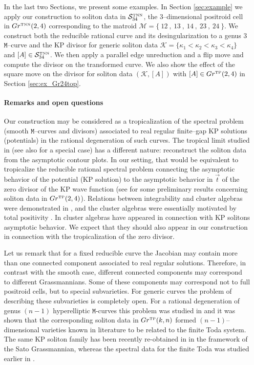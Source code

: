 \documentclass[11pt]{amsart}
\theoremstyle{plain}
\numberwithin{equation}{section}
\begin{document}
In the last two Sections, we present some examples. In Section \ref{sec:example} we apply our construction to soliton data in ${\mathcal S}_{34}^{\mbox{\tiny TNN}}$, the 3--dimensional positroid cell in $Gr^{\mbox{\tiny TNN}} (2,4)$ corresponding to the matroid
${\mathcal M} = \{ \ 12 \ , \ 13 \ , \ 14 \ ,\ 23 \ , \ 24\ \}$.
We construct both the reducible rational curve and its desingularization to a genus $3$ $\mathtt M$--curve and the KP divisor for generic soliton data $\mathcal K =\{ \kappa_1<\kappa_2<\kappa_3<\kappa_4\}$ and $[A]\in {\mathcal S}_{34}^{\mbox{\tiny TNN}}$. We then apply a parallel edge unreduction and a flip move and compute the divisor on the transformed curve.
We also show the effect of the square move on the divisor for soliton data $(\mathcal K,[A])$ with $[A] \in Gr^{\mbox{\tiny TP}} (2,4)$ in Section \ref{sec:ex_Gr24top}.

\smallskip

\paragraph{\textbf{Remarks and open questions}}
Our construction may be considered as a tropicalization of the spectral problem (smooth $\mathtt M$--curves and divisors) associated to real regular finite--gap KP solutions (potentials) in the rational degeneration of such curves. The tropical limit studied in \cite{KW2} (see also \cite{DMH} for a special case) has a different nature: reconstruct the soliton data from the asymptotic contour plots. In our setting, that would be equivalent to tropicalize the reducible rational spectral problem connecting the asymptotic behavior of the potential (KP solution) to the asymptotic behavior in $\vec t$ of the zero divisor of the KP wave function (see \cite{A2} for some preliminary results concerning soliton data in $Gr^{\mbox{\tiny TP}}(2,4)$). Relations between integrability and cluster algebras were demonstrated in \cite{FG,KG}, and the cluster algebras were essentially motivated by total positivity \cite{FZ1,FZ2}. In \cite{KW2} cluster algebras have appeared in connection with KP solitons asymptotic behavior. We expect that they should also appear in our construction in connection with the tropicalization of the zero divisor.

Let us remark that for a fixed reducible curve the Jacobian may contain more than one connected component associated to real regular solutions. Therefore, in contrast with the smooth case, different connected components may correspond to different Grassmannians. Some of these components may correspond not to full positroid cells, but to special subvarieties. For generic curves the problem of describing these subvarieties is completely open. For a rational degeneration of genus $(n-1)$ hyperelliptic $\mathtt M$-curves this problem was studied in \cite{A1} and it was shown that the corresponding soliton data in $Gr^{\mbox{\tiny TP}}(k,n)$ formed $(n-1)$--dimensional varieties known in literature \cite{BK} to be related to the finite Toda system. The same KP soliton family has been recently re-obtained in \cite{Nak} in the framework of the Sato Grassmannian, whereas the spectral data for the finite Toda was studied earlier in \cite{KV}.
\end{document}
